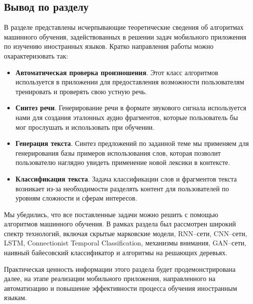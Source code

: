 \subsection{Вывод по разделу}
В разделе представлены исчерпывающие теоретические сведения об алгоритмах машинного обучения, задействованных в решении задач мобильного приложения по изучению иностранных языков. Кратко направления работы можно охарактеризовать так:
\begin{itemize}
	\item \textbf{Автоматическая проверка произношения}. Этот класс алгоритмов используется в приложении для предоставления возможности пользователям тренировать и проверять свою устную речь.
	\item \textbf{Синтез речи}. Генерирование речи в формате звукового сигнала используется нами для создания эталонных аудио фрагментов, которые пользователь бы мог прослушать и использовать при обучении.
	\item \textbf{Генерация текста}. Синтез предложений по заданной теме мы применяем для генерирования базы примеров использования слов, которая позволит пользователю наглядно увидеть применение новой лексики в контексте.
	\item \textbf{Классификация текста}. Задача классификации слов и фрагментов текста возникает из-за необходимости разделять контент для пользователей по уровням сложности и сферам интересов.
\end{itemize}

Мы убедились, что все поставленные задачи можно решить с помощью алгоритмов машинного обучения. В рамках раздела был рассмотрен широкий спектр технологий, включая скрытые марковские модели, RNN--сети, CNN--сети, LSTM, Connectionist Temporal Classification, механизмы внимания, GAN--сети, наивный байесовский классификатор и алгоритмы на решающих деревьях.

Практическая ценность информации этого раздела будет продемонстрирована далее, на этапе реализации мобильного приложения, направленного на автоматизацию и повышение эффективности процесса обучения иностранным языкам.

